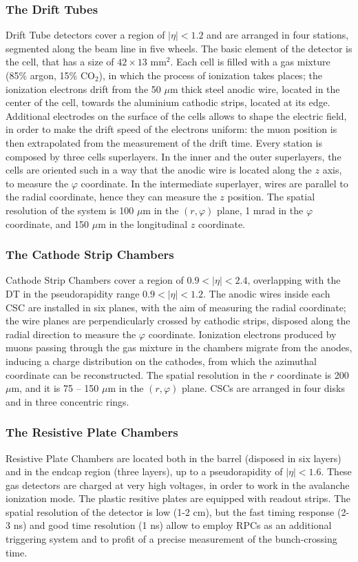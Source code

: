 \subsubsection{The Drift Tubes}
Drift Tube detectors cover a region of $|\eta|<1.2$ and are arranged in four stations, segmented along the beam line in five wheels. The basic element of the detector is the cell, that has a size of $42 \times 13 \text{ mm}^2$. Each cell is filled with a gas mixture (85\% argon, 15\% $\text{CO}_2$), in which the process of ionization takes places; the ionization electrons drift from the 50 $\mu$m thick steel anodic wire, located in the center of the cell, towards the aluminium cathodic strips, located at its edge. Additional electrodes on the surface of the cells allows to shape the electric field, in order to make the drift speed of the electrons uniform: the muon position is then extrapolated from the measurement of the drift time. Every station is composed by three cells superlayers. In the inner and the outer superlayers, the cells are oriented such in a way that the anodic wire is located along the $z$ axis, to measure the $\varphi$ coordinate. In the intermediate superlayer, wires are parallel to the radial coordinate, hence they can measure the $z$ position. The spatial resolution of the system is 100 $\mu$m in the $(r, \varphi)$ plane, 1 mrad in the $\varphi$ coordinate, and 150 $\mu$m in the longitudinal $z$ coordinate.

\subsubsection{The Cathode Strip Chambers}
Cathode Strip Chambers cover a region of $0.9<|\eta|<2.4$, overlapping with the DT in the pseudorapidity range $0.9 < |\eta| < 1.2$. The anodic wires inside each CSC are installed in six planes, with the aim of measuring the radial coordinate; the wire planes are perpendicularly crossed by cathodic strips, disposed along the radial direction to measure the $\varphi$ coordinate. Ionization electrons produced by muons passing through the gas mixture in the chambers migrate from the anodes, inducing a charge distribution on the cathodes, from which the azimuthal coordinate can be reconstructed. The spatial resolution in the $r$ coordinate is 200 $\mu$m, and it is 75 -- 150 $\mu$m in the $(r, \varphi)$ plane. CSCs are arranged in four disks and in three concentric rings.

\subsubsection{The Resistive Plate Chambers}
Resistive Plate Chambers are located both in the barrel (disposed in six layers) and in the endcap region (three layers), up to a pseudorapidity of $|\eta|<1.6$. These gas detectors are charged at very high voltages, in order to work in the avalanche ionization mode. The plastic resitive plates are equipped with readout strips. The spatial resolution of the detector is low (1-2 cm), but the fast timing response (2-3 ns) and good time resolution (1 ns) allow to employ RPCs as an additional triggering system and to profit of a precise measurement of the bunch-crossing time.

